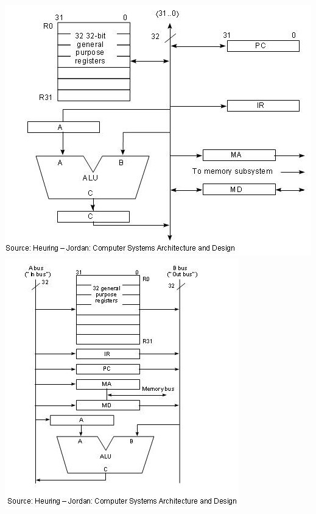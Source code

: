 \documentclass[12p,a4paper]{article}
\begin{document}
\begin{multicols}{2}
    \includegraphics[width=\columnwidth]{Figures/1bus_datapath.jpg}
    \includegraphics[width=\columnwidth]{Figures/2bus_datapath.jpg}

\end{multicols}
\end{document}
